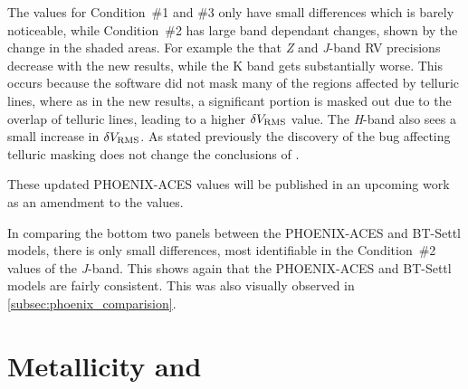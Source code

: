 The values for Condition~\#1 and \#3 only have small differences which is barely noticeable, while Condition~\#2 has large band dependant changes, shown by the change in the shaded areas.
For example the that \emph{Z} and \emph{J}-band RV precisions decrease with the new results, while the {K} band gets substantially worse.
This occurs because the software did not mask many of the regions affected by telluric lines, where as in the new results, a significant portion is masked out due to the overlap of telluric lines, leading to a higher \(\delta V_{\textrm{RMS}}\) value.
The \emph{H}-band also sees a small increase in \(\delta V_{\textrm{RMS}}\).
As stated previously the discovery of the bug affecting telluric masking does not change the conclusions of \citet{figueira_radial_2016}.

These updated {PHOENIX-ACES} values will be published in an upcoming work as an amendment to the \citep{figueira_radial_2016} values.

In comparing the bottom two panels between the {PHOENIX-ACES} and {BT-Settl} models, there is only small differences, most identifiable in the Condition~\#2 values of the \emph{J}-band. This shows again that the {PHOENIX-ACES} and {BT-Settl} models are fairly consistent. This was also visually observed in \cref{subsec:phoenix_comparision}.


\section{Metallicity and \Logg{}}
\label{sec:metallicity_logg}


